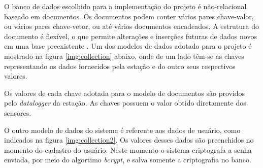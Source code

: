 O banco de dados escolhido para a implementação do projeto é não-relacional baseado em documentos. Os documentos podem conter vários pares chave-valor, ou vários pares chave-vetor, ou até vários documentos encadeados. A estrutura do documento é flexível, o que permite alterações e inserções futuras de dados novos em uma base preexistente \cite{SITEMONGODB}. Um dos modelos de dados adotado para o projeto é mostrado na figura \ref{img:collection} abaixo, onde de um lado têm-se as chaves representando os dados fornecidos pela estação e do outro seus respectivos valores.

Os valores de cada chave adotada para o modelo de documentos são providos pelo \textit{datalogger} da estação. As chaves possuem o valor obtido diretamente dos sensores.


\newpage
{}


O outro modelo de dados do sistema é referente aos dados de usuário, como indicados na figura \ref{img:collection2}. Os valores desses dados são preenchidos no momento do cadastro do usuário. Neste momento o sistema criptografa a senha enviada, por meio do algortimo \textit{bcrypt}, e salva somente a criptografia no banco. 

